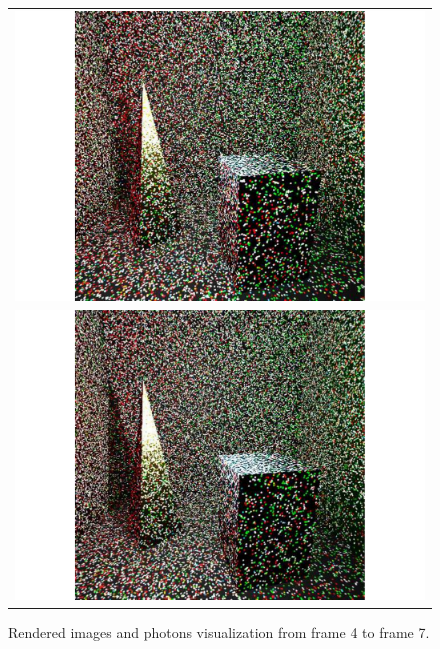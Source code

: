 \begin{figure}
\begin{center}
{\begin{tabular}{c}
\includegraphics*[scale=0.25]{imgs/pqv_frame6.pdf}\\
\includegraphics*[scale=0.25]{imgs/pqv_frame7.pdf}
\end{tabular}
}%
\renewcommand{\thefigure}{\thechapter.\arabic{figure}}
\caption[Rendered images and photons visualization from frame 4 to frame 7.]{Rendered images and photons visualization from frame 4 to frame 7.}
\label{fig:result_images2}
\end{center}
\end{figure}

